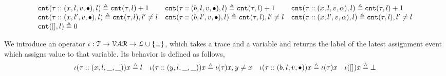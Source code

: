   \[
  \begin{array}{lll}
  \mathtt{cnt}(\mathtt{\tau} :: (x, l, v, \bullet), l ) \triangleq \mathtt{cnt}(\mathtt{\tau}, l) + 1
  &
  \mathtt{cnt}(\mathtt{\tau}  ::(b, l, v, \bullet), l) \triangleq \mathtt{cnt}(\mathtt{\tau}, l) + 1
  &
  \mathtt{cnt}(\mathtt{\tau}  :: (x, l, v, \alpha), l) \triangleq \mathtt{cnt}(\mathtt{\tau}, l) + 1
  \\
  \mathtt{cnt}(\mathtt{\tau}  :: (x, l', v, \bullet), l) \triangleq \mathtt{cnt}(\mathtt{\tau}, l), l' \neq l
  &
  \mathtt{cnt}(\mathtt{\tau}  :: (b, l', v, \bullet), l) \triangleq \mathtt{cnt}(\mathtt{\tau}, l), l' \neq l
  &
  \mathtt{cnt}(\mathtt{\tau}  :: (x, l', v, \alpha), l) \triangleq \mathtt{cnt}(\mathtt{\tau}, l), l' \neq l
  \\
  \mathtt{cnt}({[]}, l) \triangleq 0
  &&
  \end{array}
  \]
  
  We introduce an operator $\iota : \mathcal{T} \to \mathcal{VAR} \to \mathcal{L} \cup \{\bot\}$, which 
  takes a trace and a variable and returns the label of the latest assignment event which assigns value to that variable.
  Its behavior is defined as follows,
    \[
    \iota(\mathtt{\tau}  :: (x, l, \_, \_)) x \triangleq l
    ~~~
    \iota(\mathtt{\tau}  :: (y, l, \_, \_)) x \triangleq \iota(\mathtt{\tau} ) x, y \neq x
    ~~~
    \iota(\mathtt{\tau} :: (b, l, v, \bullet)) x \triangleq \iota(\mathtt{\tau}) x
    ~~~
    \iota({[]}) x \triangleq \bot
    \]


